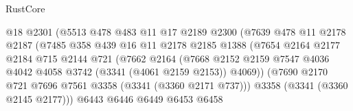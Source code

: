 \begin{lexlean}{RustCore}
\begin{coremodule}
                                  @18
                                  @2301
                                  (@5513
                                    @478
                                    @483
                                    @11
                                    @17
                                    @2189
                                    @2300
                                    (@7639
                                      @478
                                      @11
                                      @2178
                                      @2187
                                      (@7485
                                        @358
                                        @439
                                        @16
                                        @11
                                        @2178
                                        @2185
                                        @1388
                                        (@7654
                                          @2164
                                          @2177
                                          @2184
                                          @715
                                          @2144
                                          @721
                                          (@7662
                                            @2164
                                            (@7668
                                              @2152
                                              @2159
                                              @7547
                                              @4036
                                              @4042
                                              @4058
                                              @3742
                                              (@3341 (@4061 @2159 @2153))
                                              @4069))
                                          (@7690
                                            @2170
                                            @721
                                            @7696
                                            @7561
                                            @3358
                                            (@3341 (@3360 @2171 @737)))
                                          @3358
                                          (@3341 (@3360 @2145 @2177)))
                                        @6443
                                        @6446
                                        @6449
                                        @6453
                                        @6458

\end{coremodule}
\end{lexlean}
